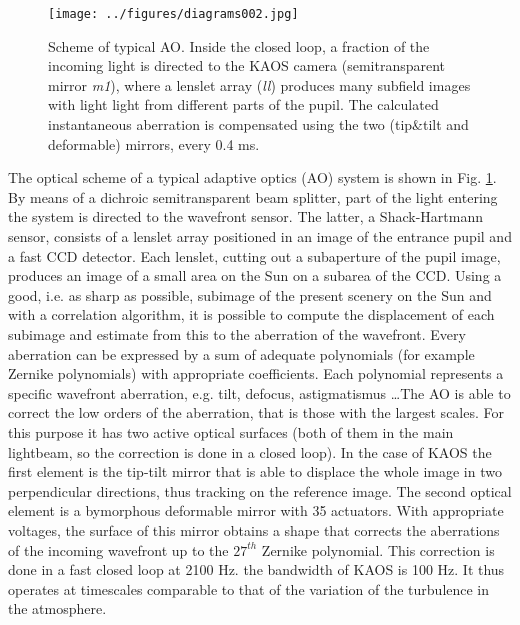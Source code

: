 \begin{figure}[t]
\begin{center}
\texttt{[image: ../figures/diagrams002.jpg]}
\caption{Scheme of typical AO. Inside the closed loop, a fraction of the incoming light is directed to the KAOS camera (semitransparent mirror \emph{m1}), where a lenslet array (\emph{ll}) produces many subfield images with light light from different parts of the pupil. The calculated instantaneous aberration is compensated using the two (tip\&tilt  and deformable) mirrors, every 0.4 ms.}
\label{fig:kaos:optical}
\end{center}
\end{figure}

The optical scheme of a typical adaptive optics  (AO) system is shown in Fig. \ref{fig:kaos:optical}. By means of a dichroic semitransparent beam splitter, part of the light entering the system is directed to the wavefront sensor. The latter, a Shack-Hartmann sensor, consists of a lenslet array positioned in an image of the entrance pupil and  a fast CCD detector. Each lenslet, cutting out a subaperture of the pupil image, produces an image of a small area on the Sun on a subarea of the CCD. Using a good, i.e. as sharp as possible, subimage of the present scenery on the Sun and with a correlation algorithm, it is possible to compute the displacement of each subimage and estimate from this to the aberration of the wavefront.
Every aberration can be expressed by a sum of adequate polynomials (for example Zernike polynomials) with appropriate coefficients. Each polynomial represents a specific wavefront aberration, e.g.  tilt, defocus, astigmatismus \dots The AO is able to correct the low orders of the aberration, that is those with the largest scales. For this purpose  it has two active optical surfaces (both of them in the main lightbeam, so the correction is done in a closed loop). In the case of KAOS the first element is the tip-tilt mirror that is able to displace the whole image in two perpendicular directions, thus tracking on the reference image. The second optical element is a bymorphous deformable mirror with 35 actuators. With appropriate voltages, the surface of this mirror obtains a shape that corrects the aberrations of the incoming wavefront up to the $27^{th}$ Zernike polynomial. This correction is done in a fast closed loop at 2100 Hz. the bandwidth of KAOS is 100 Hz. It thus operates at timescales comparable to that of the variation of the turbulence in the atmosphere.

